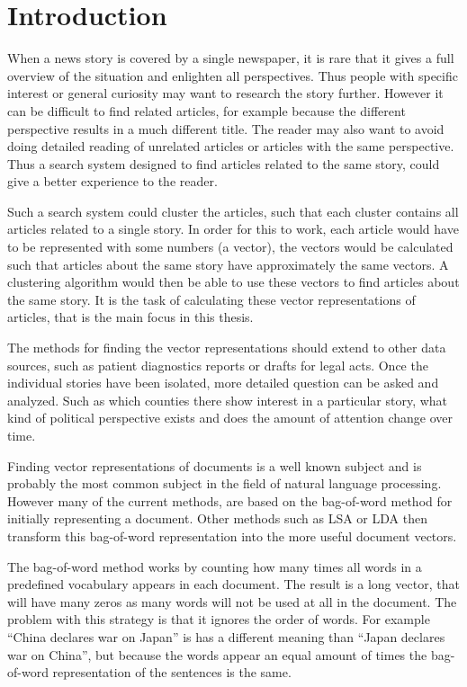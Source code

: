 \chapter{Introduction}

When a news story is covered by a single newspaper, it is rare that it gives a full overview of the situation and enlighten all perspectives. Thus people with specific interest or general curiosity may want to research the story further. However it can be difficult to find related articles, for example because the different perspective results in a much different title. The reader may also want to avoid doing detailed reading of unrelated articles or articles with the same perspective. Thus a search system designed to find articles related to the same story, could give a better experience to the reader.

Such a search system could cluster the articles, such that each cluster contains all articles related to a single story. In order for this to work, each article would have to be represented with some numbers (a vector), the vectors would be calculated such that articles about the same story have approximately the same vectors. A clustering algorithm would then be able to use these vectors to find articles about the same story. It is the task of calculating these vector representations of articles, that is the main focus in this thesis.

The methods for finding the vector representations should extend to other data sources, such as patient diagnostics reports or drafts for legal acts. Once the individual stories have been isolated, more detailed question can be asked and analyzed. Such as which counties there show interest in a particular story, what kind of political perspective exists and does the amount of attention change over time. 

Finding vector representations of documents is a well known subject and is probably the most common subject in the field of natural language processing. However many of the current methods, are based on the bag-of-word method for initially representing a document. Other methods such as LSA or LDA then transform this bag-of-word representation into the more useful document vectors.

The bag-of-word method works by counting how many times all words in a predefined vocabulary appears in each document. The result is a long vector, that will have many zeros as many words will not be used at all in the document. The problem with this strategy is that it ignores the order of words. For example ``China declares war on Japan'' is has a different meaning than ``Japan declares war on China'', but because the words appear an equal amount of times the bag-of-word representation of the sentences is the same.

